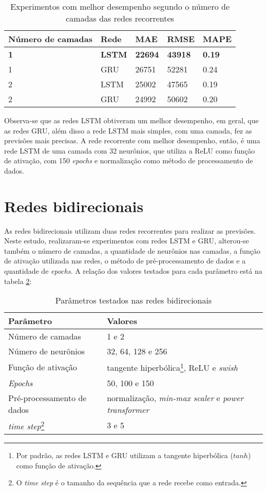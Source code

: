 \begin{table}[H]
    \centering
    \caption{Experimentos com melhor desempenho segundo o número de camadas das redes recorrentes}
    \begin{tabular}{lllll}
    \toprule
    Número de camadas & Rede & MAE & RMSE & MAPE \\
    \midrule
    \textbf{1} & \textbf{LSTM} & \textbf{22694}  & \textbf{43918} & \textbf{0.19}\\
    1 & GRU  & 26751  & 52281  & 0.24 \\
    2 & LSTM & 25002  & 47565 & 0.19  \\
    2 & GRU  & 24992  & 50602  & 0.20 \\
    \bottomrule
    \end{tabular}
    \label{tab:res-rnn}
\end{table}

Observa-se que as redes LSTM obtiveram um melhor desempenho, em geral, que as
redes GRU, além disso a rede LSTM mais simples, com uma camada, fez as previsões 
mais precisas. A rede recorrente com melhor desempenho, então, é uma rede LSTM 
de uma camada com 32 neurônios, que utiliza a ReLU como função de ativação, com 
150 \textit{epochs} e normalização como método de processamento de dados.

\section{Redes bidirecionais}

As redes bidirecionais utilizam duas redes recorrentes para 
realizar as previsões. Neste estudo, realizaram-se experimentos com redes
LSTM e GRU, alterou-se também o número de camadas, a quantidade de neurônios
nas camadas, a função de ativação utilizada nas redes, o método de pré-processamento
de dados e a quantidade de \textit{epochs}. A relação dos valores testados 
para cada parâmetro está na tabela \ref{tab:param-bi}:

\begin{table}[H]
    \centering
    \begin{tabular}{ll}
        \toprule
        Parâmetro           & Valores   \\
        \midrule
        Número de camadas   & 1 e 2 \\
        Número de neurônios & 32, 64, 128 e 256       \\
        Função de ativação  & tangente hiperbólica\footnote{Por padrão, as redes LSTM e GRU utilizam a tangente hiperbólica ($tanh$) como função de ativação.}, ReLU e \textit{swish}  \\
        \textit{Epochs}              & 50, 100 e 150      \\
        Pré-processamento de dados & normalização, \textit{min-max scaler} e \textit{power transformer}\\
        \textit{time step}\footnote{O \textit{time step} é o tamanho da sequência que a rede recebe como entrada.}  & 3 e 5 \\
        \bottomrule
    \end{tabular}
    \caption{Parâmetros testados nas redes bidirecionais}
    \label{tab:param-bi}
\end{table} 


